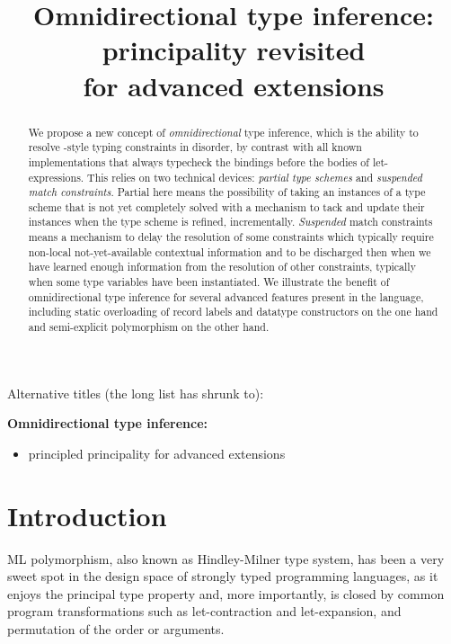 \documentclass[acmsmall,screen,nonacm]{acmart}
\title{Omnidirectional type inference: 
   principality revisited \\ for advanced \ML extensions
}
\begin{document}
\begin{abstract}
We propose a new concept of \emph{omnidirectional} type inference, which is
the ability to resolve \ML-style typing constraints in disorder, by
contrast with all known implementations that always typecheck the
bindings before the bodies of let-expressions.
%
This relies on two technical devices: \emph{partial type schemes}
and \emph{suspended match constraints}. Partial here means  the
possibility of taking an instances of a type scheme that is not yet
completely solved with a mechanism to tack and update their instances when
the type scheme is refined, incrementally.
\emph{Suspended} match constraints means a mechanism to delay the resolution of
some constraints which typically require non-local not-yet-available
contextual information and to be discharged then when we have learned enough
information from the resolution of other constraints, typically when some type
variables have been instantiated.
%
We illustrate the benefit of omnidirectional type inference for several
advanced features present in the \OCaml language, including static
overloading of record labels and datatype constructors on the one hand and
semi-explicit polymorphism on the other hand.
\end{abstract}

\maketitle

\begin{version}[Titles]{\blue\True}
Alternative titles (the long list has shrunk to):

\medskip
\noindent \textbf{Omnidirectional type inference:}
\begin{itemize}
\item principled principality for advanced \ML extensions
\end{itemize}

\end{version}

\section{Introduction}

ML polymorphism, also known as Hindley-Milner type system, has been a very
sweet spot in the design space of strongly typed programming languages, as
it enjoys the principal type property and, more importantly, is closed by
common program transformations such as let-contraction and let-expansion,
and permutation of the order or arguments.
\end{document}
